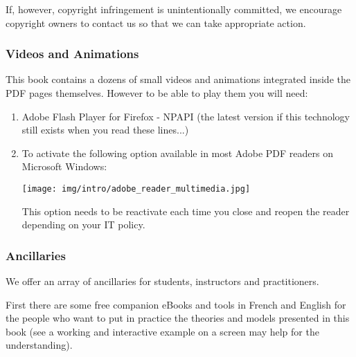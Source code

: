 	If, however, copyright infringement is unintentionally committed, we encourage copyright owners to contact us so that we can take appropriate action.
	
	\subsubsection{Videos and Animations}
	This book contains a dozens of small videos and animations integrated inside the PDF pages themselves. However to be able to play them you will need:
	\begin{enumerate}
		\item Adobe Flash Player for Firefox - NPAPI (the latest version if this technology still exists when you read these lines...)
		
		\item To activate the following option available in most Adobe PDF readers on Microsoft Windows:
		\begin{center}
			\texttt{[image: img/intro/adobe\_reader\_multimedia.jpg]}
		\end{center}
		This option needs to be reactivate each time you close and reopen the reader depending on your IT policy.
	\end{enumerate}
	
	\subsubsection{Ancillaries}
	We offer an array of ancillaries for students, instructors and practitioners.
	
	First there are some free companion eBooks and tools in French and English  for the people who want to put in practice the theories and models presented in this book (see a working and interactive example on a screen may help for the understanding).
	
